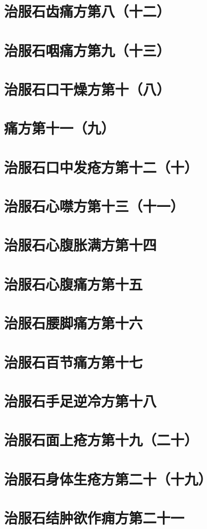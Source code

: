 \documentclass[a4paper,12pt,UTF8,twoside]{ctexbook}
\begin{document}
\chapter{治服石齿痛方第八（十二）}
\chapter{治服石咽痛方第九（十三）}
\chapter{治服石口干燥方第十（八）}
\chapter{痛方第十一（九）}
\chapter{治服石口中发疮方第十二（十）}
\chapter{治服石心噤方第十三（十一）}
\chapter{治服石心腹胀满方第十四}
\chapter{治服石心腹痛方第十五}
\chapter{治服石腰脚痛方第十六}
\chapter{治服石百节痛方第十七}
\chapter{治服石手足逆冷方第十八}
\chapter{治服石面上疮方第十九（二十）}
\chapter{治服石身体生疮方第二十（十九）}
\chapter{治服石结肿欲作痈方第二十一}
\end{document}
